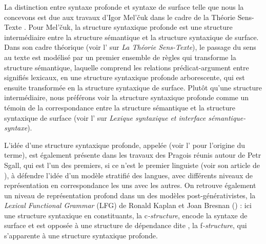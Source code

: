 {La distinction entre syntaxe profonde et syntaxe de surface telle que nous la concevons est due aux travaux d’Igor Mel’čuk dans le cadre de la Théorie Sens-Texte . Pour Mel’čuk, la structure syntaxique profonde est une structure intermédiaire entre la structure sémantique et la structure syntaxique de surface. Dans son cadre théorique (voir l’ sur \textit{La Théorie Sens-Texte}), le passage du sens au texte est modélisé par un premier ensemble de règles qui transforme la structure sémantique, laquelle comprend les relations prédicat-argument entre signifiés lexicaux, en une structure syntaxique profonde arborescente, qui est ensuite transformée en la structure syntaxique de surface. Plutôt qu’une structure intermédiaire, nous préférons voir la structure syntaxique profonde comme un témoin de la correspondance entre la structure sémantique et la structure syntaxique de surface (voir l’ sur \textit{Lexique syntaxique et interface sémantique-syntaxe}). 

L’idée d’une structure syntaxique profonde, appelée  (voir l’ pour l’origine du terme), est également présente dans les travaux des Pragois réunis autour de Petr Sgall, qui est l’un des premiers, si ce n’est le premier linguiste (voir son article de \citeyear{sgall1967functional}), à défendre l’idée d’un modèle stratifié des langues, avec différents niveaux de représentation en correspondance les uns avec les autres. On retrouve également un niveau de représentation profond dans un des modèles post-générativistes, la \textit{Lexical Functional Grammar} (LFG) de Ronald Kaplan et Joan Bresnan (\citeyear{kaplan1981lexical}) : ici une structure syntaxique en constituants, la c\textit{-structure}, encode la syntaxe de surface et est opposée à une structure de dépendance dite , la f\textit{-structure}, qui s’apparente à une structure syntaxique profonde.

}
